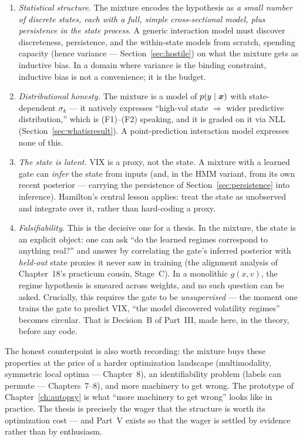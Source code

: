 \begin{enumerate}[leftmargin=2em]
\item \emph{Statistical structure.} The mixture encodes the hypothesis as
  \emph{a small number of discrete states, each with a full, simple
  cross-sectional model, plus persistence in the state process}. A generic
  interaction model must discover discreteness, persistence, and the
  within-state models from scratch, spending capacity (hence variance ---
  Section~\ref{sec:hostile}) on what the mixture gets as inductive bias. In
  a domain where variance is the binding constraint, inductive bias is not a
  convenience; it is the budget.
\item \emph{Distributional honesty.} The mixture is a model of
  $p(y \mid \bm{x})$ with state-dependent $\sigma_k$ --- it natively expresses
  ``high-vol state $\Rightarrow$ wider predictive distribution,'' which is
  (F1)--(F2) speaking, and it is graded on it via NLL
  (Section~\ref{sec:whatisresult}). A point-prediction interaction model
  expresses none of this.
\item \emph{The state is latent.} VIX is a proxy, not the state. A mixture
  with a learned gate can \emph{infer} the state from inputs (and, in the
  HMM variant, from its own recent posterior --- carrying the persistence of
  Section~\ref{sec:persistence} into inference). Hamilton's central lesson
  applies: treat the state as unobserved and integrate over it, rather than
  hard-coding a proxy.
\item \emph{Falsifiability.} This is the decisive one for a thesis. In the
  mixture, the state is an explicit object: one can ask ``do the learned
  regimes correspond to anything real?'' and answer by correlating the
  gate's inferred posterior with \emph{held-out} state proxies it never saw
  in training (the alignment analysis of Chapter~18's practicum
  cousin, Stage~C). In a monolithic $g(x, v)$, the regime hypothesis is
  smeared across weights, and no such question can be asked. Crucially, this
  requires the gate to be \emph{unsupervised} --- the moment one trains the
  gate to predict VIX, ``the model discovered volatility regimes'' becomes
  circular. That is Decision~B of Part~III, made here, in the theory, before
  any code.
\end{enumerate}

The honest counterpoint is also worth recording: the mixture buys these
properties at the price of a harder optimization landscape (multimodality,
symmetric local optima --- Chapter~8), an identifiability problem (labels
can permute --- Chapters~7--8), and more machinery to get wrong. The
prototype of Chapter~\ref{ch:autopsy} is what ``more machinery to get
wrong'' looks like in practice. The thesis is precisely the wager that the
structure is worth its optimization cost --- and Part~V exists so that the
wager is settled by evidence rather than by enthusiasm.


